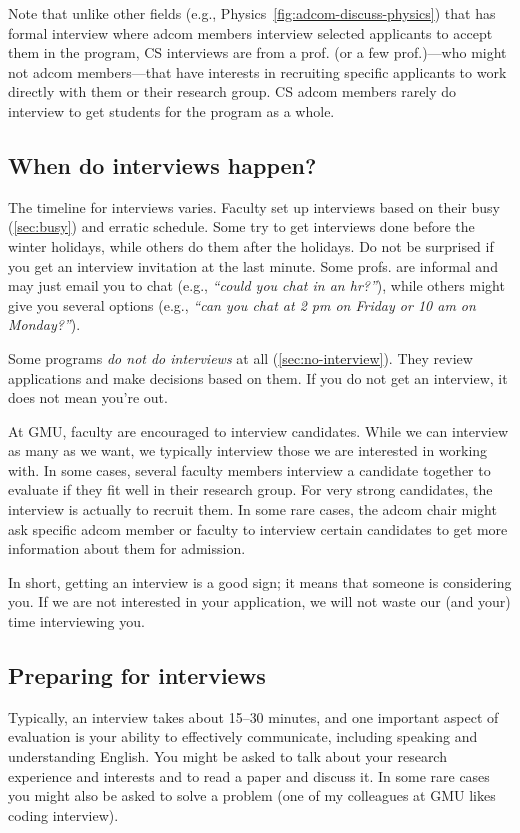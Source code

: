 \documentclass[oneside,11pt]{book}
\newenvironment{commentbox}[1][]{
  \small
  \begin{marker}[\faChessPawn{}]
    {\textbf{#1}}
  }{
  \end{marker}
}
\begin{document}
Note that unlike other fields (e.g., Physics~\autoref{fig:adcom-discuss-physics}) that has formal interview where adcom members interview selected applicants to accept them in the program, CS interviews are from a prof. (or a few prof.)---who might not adcom members---that have interests in recruiting specific applicants to work directly with them or their research group.  CS adcom members rarely do interview to get students for the program as a whole.  


\subsection{When do interviews happen?}

The timeline for interviews varies.  Faculty set up interviews based on their busy (\autoref{sec:busy}) and erratic schedule. Some try to get interviews done before the winter holidays, while others do them after the holidays.
Do not be surprised if you get an interview invitation at the last minute. Some profs. are informal and may just email you to chat (e.g., \emph{``could you chat in an hr?''}), while others might give you several options (e.g., \emph{``can you chat at 2 pm on Friday or 10 am on Monday?''}).


Some programs \emph{do not do interviews} at all (\autoref{sec:no-interview}). They review applications and make decisions based on them.  If you do not get an interview, it does not mean you're out.

\begin{commentbox}
    At GMU, faculty are encouraged to interview candidates. While we can interview as many as we want, we typically interview those we are interested in working with. In some cases, several faculty members interview a candidate together to evaluate if they fit well in their research group. For very strong candidates, the interview is actually to recruit them.  
    In some rare cases, the adcom chair might ask specific adcom member or faculty to interview certain candidates to get more information about them for admission.
        
    In short, getting an interview is a good sign; it means that someone is considering you. If we are not interested in your application, we will not waste our (and your) time interviewing you.
\end{commentbox}

\subsection{Preparing for interviews} Typically, an interview takes about 15--30 minutes, and one important aspect of evaluation is your ability to effectively communicate, including speaking and understanding English. 
You might be asked to talk about your research experience and interests and to read a paper and discuss it. In some rare cases you might also be asked to solve a problem (one of my colleagues at GMU likes coding interview).
\end{document}
